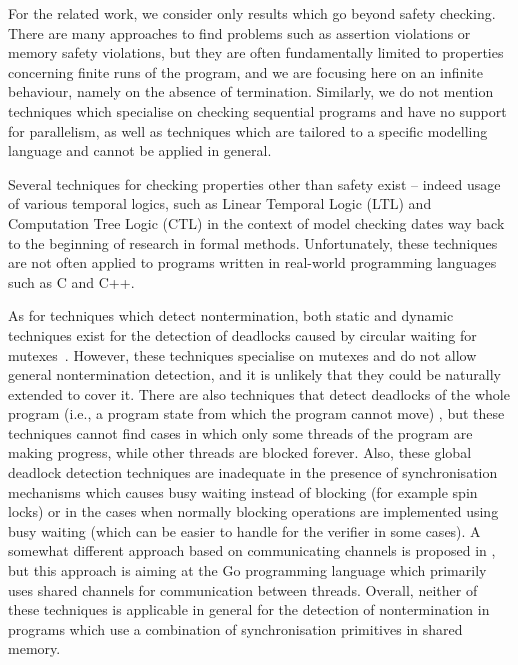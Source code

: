 For the related work, we consider only results which go beyond safety checking.
There are many approaches to find problems such as assertion violations or memory safety violations, but they are often fundamentally limited to properties concerning finite runs of the program, and we are focusing here on an infinite behaviour, namely on the absence of termination.
Similarly, we do not mention techniques which specialise on checking sequential programs and have no support for parallelism, as well as techniques which are tailored to a specific modelling language and cannot be applied in general.

Several techniques for checking properties other than safety exist -- indeed
usage of various temporal logics, such as Linear Temporal Logic (LTL)
 and Computation Tree Logic (CTL)  in the context of model checking dates way back to the beginning of research in formal methods.
Unfortunately, these techniques are not often applied to programs written in real-world programming languages such as C and C++.

As for techniques which detect nontermination, both static and dynamic
techniques exist for the detection of deadlocks caused by circular waiting for
mutexes~.
However, these techniques specialise on mutexes and do not allow general nontermination detection, and it is unlikely that they could be naturally extended to cover it.
There are also techniques that detect deadlocks of the whole program (i.e., a program state from which the program cannot move) , but these techniques cannot find cases in which only some threads of the program are making progress, while other threads are blocked forever.
Also, these global deadlock detection techniques are inadequate in the presence of synchronisation mechanisms which causes busy waiting instead of blocking (for example spin locks) or in the cases when normally blocking operations are implemented using busy waiting (which can be easier to handle for the verifier in some cases).
A somewhat different approach based on communicating channels is proposed in , but this approach is aiming at the Go programming language which primarily uses shared channels for communication between threads.
Overall, neither of these techniques is applicable in general for the detection of nontermination in programs which use a combination of synchronisation primitives in shared memory.

